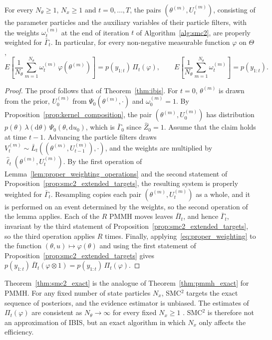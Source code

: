 \begin{theorem}
    \label{thm:smc2_exact}
    For every $N_\theta\ge1$, $N_x\ge1$ and $t=0,\ldots,T$, the pairs $(\theta^{(m)},U_t^{(m)})$, consisting of the parameter particles and the auxiliary variables of their particle filters, with the weights $\omega_t^{(m)}$ at the end of iteration $t$ of Algorithm~\ref{alg:smc2}, are properly weighted for $\bar{\Gamma}_t$. In particular, for every non-negative measurable function $\varphi$ on $\Theta$,
    \begin{equation}
        E\left[\frac{1}{N_\theta}\sum_{m=1}^{N_\theta}\omega_t^{(m)}\,\varphi(\theta^{(m)})\right] = p(y_{1:t})\,\Pi_t(\varphi), \qquad
        E\left[\frac{1}{N_\theta}\sum_{m=1}^{N_\theta}\omega_t^{(m)}\right] = p(y_{1:t}).
    \end{equation}
\end{theorem}
\begin{proof}
    The proof follows that of Theorem~\ref{thm:ibis}. For $t=0$, $\theta^{(m)}$ is drawn from the prior, $U_0^{(m)}$ from $\Psi_0(\theta^{(m)},\cdot)$ and $\omega_0^{(m)} = 1$. By Proposition~\ref{prop:kernel_composition}, the pair $(\theta^{(m)},U_0^{(m)})$ has distribution $p(\theta)\,\lambda(\mathrm{d}\theta)\,\Psi_0(\theta,\mathrm{d}u_0)$, which is $\bar{\Gamma}_0$ since $\hat{Z}_0 = 1$. Assume that the claim holds at time $t-1$. Advancing the particle filters draws $V_t^{(m)}\sim\bar{L}_t((\theta^{(m)},U_{t-1}^{(m)}),\cdot)$, and the weights are multiplied by $\hat{\ell}_t(\theta^{(m)},U_t^{(m)})$. By the first operation of Lemma~\ref{lem:proper_weighting_operations} and the second statement of Proposition~\ref{prop:smc2_extended_targets}, the resulting system is properly weighted for $\bar{\Gamma}_t$. Resampling copies each pair $(\theta^{(m)},U_t^{(m)})$ as a whole, and it is performed on an event determined by the weights, so the second operation of the lemma applies. Each of the $R$ PMMH moves leaves $\bar{\Pi}_t$, and hence $\bar{\Gamma}_t$, invariant by the third statement of Proposition~\ref{prop:smc2_extended_targets}, so the third operation applies $R$ times. Finally, applying~\eqref{eq:proper_weighting} to the function $(\theta,u)\mapsto\varphi(\theta)$ and using the first statement of Proposition~\ref{prop:smc2_extended_targets} gives $p(y_{1:t})\,\bar{\Pi}_t(\varphi\otimes1) = p(y_{1:t})\,\Pi_t(\varphi)$.
\end{proof}

Theorem~\ref{thm:smc2_exact} is the analogue of Theorem~\ref{thm:pmmh_exact} for PMMH. For any fixed number of state particles $N_x$, SMC$^2$ targets the exact sequence of posteriors, and the evidence estimator is unbiased. The estimates of $\Pi_t(\varphi)$ are consistent as $N_\theta\to\infty$ for every fixed $N_x\ge1$ \cite{chopin2013smc2}. SMC$^2$ is therefore not an approximation of IBIS, but an exact algorithm in which $N_x$ only affects the efficiency.

